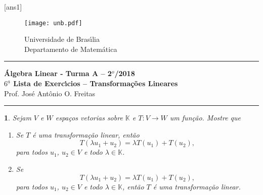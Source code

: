 \documentclass[12pt]{exam}
\newtheorem{exercicio}{}
\newcommand{\cp}[1]{\mathbb{#1}}
\newcommand{\vesp}[1]{\vspace{ #1  cm}}
\begin{document}
\pagestyle{empty}

[ans1]

\begin{figure}[h]
        \begin{minipage}[c]{1.7cm}
        \texttt{[image: unb.pdf]}
        \end{minipage}%
        \hspace{0pt}
        \begin{minipage}[c]{4in}
          {Universidade de Bras{\'\i}lia} \\
          {Departamento de Matem{\'a}tica}
\end{minipage}
\end{figure}

\vesp{-0.35} \hrule

\begin{center}
{\Large\bf \'Algebra Linear - Turma A -- 2$^{o}$/2018} \\ \vspace{9pt} {\large\bf
  $6^{\underline{a}}$ Lista de Exerc{\'\i}cios -- Transforma\c{c}\~oes Lineares}\\ \vspace{9pt} Prof. Jos{\'e} Ant{\^o}nio O. Freitas
\end{center}
\hrule

\vesp{.6}

\begin{exercicio}
  Sejam $V$ e $W$ espa\c{c}os vetorias sobre $\cp{K}$ e $T : V \to W$ um fun\c{c}\~ao. Mostre que
  \begin{enumerate}[label=({\alph*})]
    \item Se $T$ \'e uma transforma\c{c}\~ao linear, ent\~ao
  \[
    T(\lambda u_1 + u_2) = \lambda T(u_1) + T(u_2),
  \]
  para todos $u_1$, $u_2 \in V$ e todo $\lambda \in \cp{K}$.
  \item Se
  \[
    T(\lambda u_1 + u_2) = \lambda T(u_1) + T(u_2),
  \]
  para todos $u_1$, $u_2 \in V$ e todo $\lambda \in \cp{K}$, ent\~ao $T$ \'e uma transforma\c{c}\~ao linear.
  \end{enumerate}

\end{exercicio}
\end{document}
